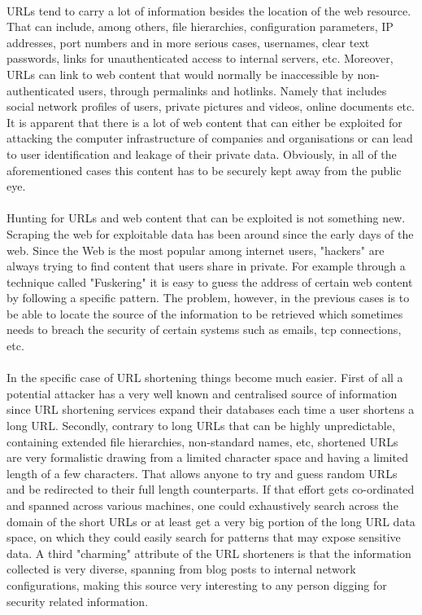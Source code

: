 \documentclass[12pt]{article}
\begin{document}
\paragraph{}
URLs tend to carry a lot of information besides the location of the web resource. That can include, among others, file hierarchies, configuration parameters, IP addresses, port numbers and in more serious cases, usernames, clear text passwords, links for unauthenticated access to internal servers, etc. Moreover, URLs can link to web content that would normally be inaccessible by non-authenticated users, through permalinks and hotlinks. Namely that includes social network profiles of users, private pictures and videos, online documents etc. It is apparent that there is a lot of web content that can either be exploited for attacking the computer infrastructure of companies and organisations or can lead to user identification and leakage of their private data. Obviously, in all of the aforementioned cases this content has to be securely kept away from the public eye.
\paragraph{}
Hunting for URLs and web content that can be exploited is not something new. Scraping the web for exploitable data has been around since the early days of the web. Since the Web is the most popular among internet users, "hackers" are always trying to find content that users share in private. For example through a technique called "Fuskering" it is easy to guess the address of certain web content by following a specific pattern. The problem, however, in the previous cases  is to be able to locate the source of the information to be retrieved which sometimes needs to breach the security of certain systems such as emails, tcp connections, etc.
\paragraph{}
In the specific case of URL shortening things become much easier. First of all a potential attacker has a very well known and centralised source of information since URL shortening services expand their databases each time a user shortens a long URL. Secondly, contrary to long URLs that can be highly unpredictable, containing extended file hierarchies, non-standard names, etc, shortened URLs are very formalistic drawing from a limited character space and having a limited length of a few characters. That allows anyone to try and guess random URLs and be redirected to their full length counterparts. If that effort gets co-ordinated and spanned across various machines, one could exhaustively search across the domain of the short URLs or at least get a very big portion of the long URL data space, on which they could easily search for patterns that may expose sensitive data. A third "charming" attribute of the URL shorteners is that the information collected is very diverse, spanning from blog posts to internal network configurations, making this source very interesting to any person digging for security related information. 
\end{document}
